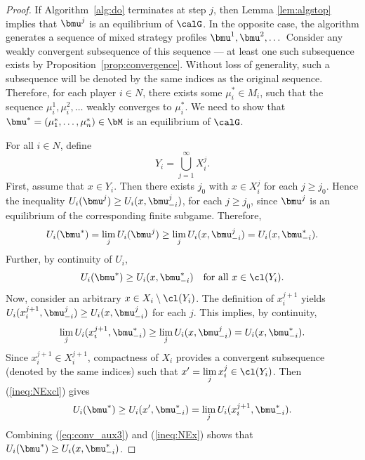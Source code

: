 \begin{proof}
	If Algorithm~\ref{alg:do} terminates at step $j$, then Lemma \ref{lem:algstop} implies that $\bmu^j$ is an equilibrium of $\calG$. In the opposite case, the algorithm generates a sequence of mixed strategy profiles $\bmu^1, \bmu^2, \dots$ Consider any weakly convergent subsequence of this sequence --- at least one such subsequence exists by Proposition~\ref{prop:convergence}. Without loss of generality, such a subsequence will be denoted by the same indices as the original sequence. Therefore, for each player $i\in N$, there exists some $\mu^*_i\in M_i$, such that the sequence $\mu_i^1,\mu_i^2,\dots$ weakly converges to $\mu_i^*$. We need to show that  $\bmu^*=(\mu^*_1,\dots,\mu^*_n)\in \bM$ is an equilibrium of $\calG$.

	For all $i\in N$, define
	\[
		Y_i = \bigcup_{j=1}^{\infty} X^j_i.
	\]
	First, assume that $x\in Y_i$. Then there exists $j_0$ with $x\in X_i^j$ for each $j\ge j_0$. Hence the inequality $U_i(\bmu^j) \geq U_i(x,\bmu_{-i}^j)$, for each $j\ge j_0$, since $\bmu^j$ is an equilibrium of the corresponding finite subgame. Therefore,
	\[
		U_i(\bmu^*) = \lim_{j}U_i(\bmu^j) \geq \lim_{j} U_i(x,\bmu_{-i}^j) = U_i(x,\bmu_{-i}^*).
	\]
	Further, by continuity of $U_i$,
	\begin{equation}\label{ineq:NExcl}
		U_i(\bmu^*) \geq  U_i(x,\bmu_{-i}^*) \quad \text{for all } x\in\cl(Y_i).
	\end{equation}
	Now, consider an arbitrary $x\in X_i\setminus \cl(Y_i)$. The definition of $x_{i}^{j+1}$ yields $U_i(x_{i}^{j+1},\bmu^j_{-i}) \geq U_i(x,\bmu^j_{-i})$ for each $j$. This implies, by continuity,
	\begin{equation}\label{eq:conv_aux3}
		\lim_{j} U_i(x_{i}^{j+1},\bmu_{-i}^*) \geq \lim_{j} U_i(x,\bmu^j_{-i}) =  U_i(x,\bmu_{-i}^*).
	\end{equation}
	Since $x_{i}^{j+1}\in X_i^{j+1}$, compactness of $X_i$ provides a convergent subsequence (denoted by the same indices) such that $ x'= \lim\limits_j x_i^{j} \in \cl(Y_i)$. Then (\ref{ineq:NExcl}) gives
	\begin{equation}\label{ineq:NEx}
		U_i(\bmu^*)\ge U_i(x',\bmu_{-i}^*) =\lim_{j} U_i(x_{i}^{j+1},\bmu_{-i}^*).
	\end{equation}
	Combining (\ref{eq:conv_aux3}) and (\ref{ineq:NEx}) shows that $U_i(\bmu^*) \geq  U_i(x,\bmu_{-i}^*)$.
\end{proof}


